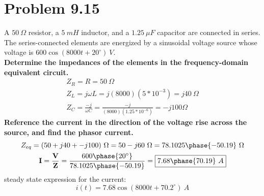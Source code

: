 \documentclass[12pt]{article}
\begin{document}
    \section*{Problem 9.15}
    A $50\ \Omega$ resistor, a $5\ mH$ inductor, and a $1.25\ \mu F$ capacitor
    are connected in series. The series-connected elements are energized by a
    sinusoidal voltage source whose voltage is $600 \cos (8000 t + 20^{\circ})\
    V$. \\
    \textbf{Determine the impedances of the elements in the frequency-domain
    equivalent circuit.}
    \begin{gather*}
        Z_{R} = R = \boxed{50\ \Omega} \\
        Z_{L} = j \omega L = j (8000) (5*10^{-3}) = \boxed{j 40\ \Omega} \\
        Z_{C} = \frac{-j}{\omega C} = \frac{-j}{(8000)(1.25*10^{-6})} =
        \boxed{-j 100 \Omega}
    \end{gather*}
    \textbf{Reference the current in the direction of the voltage rise across
    the source, and find the phasor current.}
    \begin{gather*}
        Z_{eq} = (50 + j 40 + -j 100)\ \Omega = 50 - j 60\ \Omega = 78.1025
        \phase{-50.19}\ \Omega \\
        \textbf{I} = \frac{\textbf{V}}{\textbf{Z}} = \frac{600
        \phase{20^{\circ}}}{78.1025 \phase{-50.19}} = \boxed{7.68 \phase{70.19}\
        A}
    \end{gather*}
    steady state expression for the current:
    \[
        \boxed{i(t) = 7.68 \cos (8000 t + 70.2^{\circ})\ A}
    \]
\end{document}
